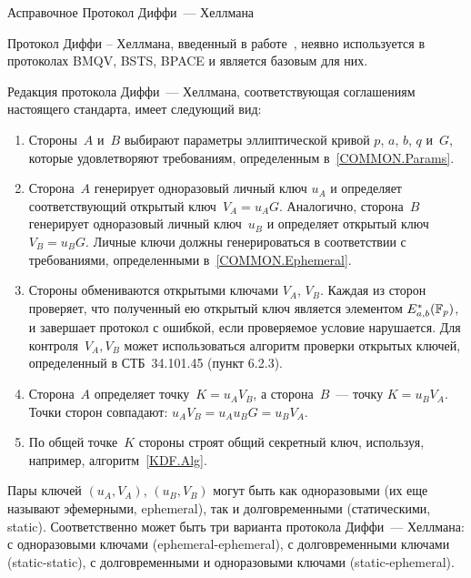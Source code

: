 \begin{appendix}{А}{справочное}
{Протокол Диффи~--- Хеллмана}
\label{DH}

\mbox{}

Протокол Диффи -- Хеллмана, введенный в работе~\cite{DH}, 
неявно используется в протоколах BMQV, BSTS, BPACE
и является базовым для них.

Редакция протокола Диффи~--- Хеллмана, соответствующая соглашениям
настоящего стандарта, имеет следующий вид:
\begin{enumerate}
\item
Стороны~$A$ и~$B$ выбирают параметры эллиптической кривой
$p$, $a$, $b$, $q$ и~$G$, 
которые удовлетворяют требованиям, определенным в~\ref{COMMON.Params}. 

\item
Сторона~$A$ генерирует одноразовый личный ключ 
$u_A$
и определяет соответствующий открытый ключ~$V_A=u_A G$.
%
Аналогично,                
сторона~$B$ генерирует одноразовый личный ключ~$u_B$ 
и определяет открытый ключ~$V_B=u_B G$.
%
Личные ключи должны генерироваться 
в соответствии с требованиями, определенными 
в~\ref{COMMON.Ephemeral}.

\item
Стороны обмениваются открытыми ключами $V_A$, $V_B$.
%
Каждая из сторон проверяет, что полученный ею
открытый ключ является элементом $E_{a,b}^*(\mathbb{F}_p)$,
и завершает протокол с ошибкой,
если проверяемое условие нарушается.
%
Для контроля~$V_A,V_B$ может использоваться
алгоритм проверки открытых ключей, 
определенный в СТБ~34.101.45 (пункт 6.2.3).

\item
Сторона~$A$ определяет точку~$K=u_A V_B$,
а сторона~$B$~--- точку $K=u_B V_A$.
Точки сторон совпадают: $u_A V_B = u_A u_B G = u_B V_A$.

\item
По общей точке~$K$ стороны строят общий секретный ключ,
используя, например, алгоритм~\ref{KDF.Alg}.
\end{enumerate}


Пары ключей $(u_A,V_A)$, $(u_B,V_B)$
могут быть как одноразовыми (их еще называют эфемерными,
ephemeral), так и долговременными (статическими, static).
%
Соответственно может быть три варианта протокола 
Диффи~--- Хеллмана:
с одноразовыми ключами (ephemeral-ephemeral),
с долговременными ключами (static-static),
с долговременными и одноразовыми ключами (static-ephemeral).


\end{appendix}
